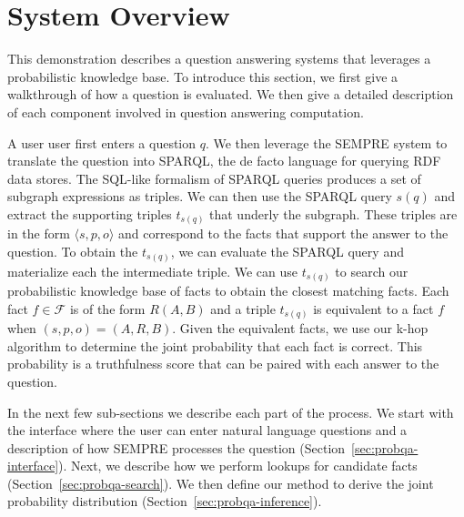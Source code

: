 
\section{System Overview}

This demonstration describes a question answering systems that leverages a probabilistic knowledge base.
To introduce this section, we first give a walkthrough of how a question is evaluated.
We then give a detailed description of each component involved in question answering computation.




A user user first enters a question \(q\). 
We then leverage the SEMPRE system to translate the question into SPARQL, the de facto language for querying RDF data stores.
The  SQL-like formalism of SPARQL queries produces a set of subgraph expressions as triples.
We can then use the SPARQL query $s(q)$ and extract the supporting triples \(t_{s(q)}\) that underly the subgraph.
These triples are in the form \(\langle s, p, o \rangle\) and correspond to the facts that support the answer to the question.
To obtain the \(t_{s(q)}\), we can evaluate the SPARQL query and materialize each the intermediate triple.
We can use \(t_{s(q)}\) to search our probabilistic knowledge base of facts to obtain the closest matching facts.
Each fact \(f \in \mathcal{F}\) is of the form \(R(A,B)\) and a triple \(t_{s(q)}\) is equivalent to a fact \(f\) when 
\( (s,p,o) = (A,R,B) \).
Given the equivalent facts, we use our k-hop algorithm to determine the joint probability that each fact is correct.
This probability is a truthfulness score that can be paired with each answer to the question.

In the next few sub-sections we describe each part of the process. We start
with the interface where the user can enter natural language questions and a
description of how SEMPRE processes the question (Section~\ref{sec:probqa-interface}).
Next, we describe how we perform lookups for candidate facts (Section~\ref{sec:probqa-search}).
We then define our method to derive the joint probability distribution (Section~\ref{sec:probqa-inference}).



